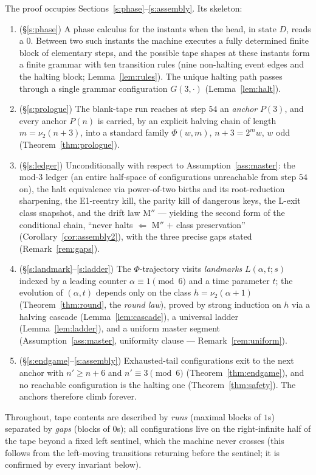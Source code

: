 \documentclass[11pt]{amsart}
\theoremstyle{definition}
\newcommand{\vtwo}[1]{\nu_2(#1)}
\begin{document}
The proof occupies Sections~\ref{s:phase}--\ref{s:assembly}. Its skeleton:
\begin{enumerate}
\item (\S\ref{s:phase}) A phase calculus for the instants when the head, in
state $D$, reads a $0$. Between two such instants the machine executes a
fully determined finite block of elementary steps, and the possible tape
shapes at these instants form a finite grammar with ten transition rules
(nine non-halting event edges and the halting block; Lemma~\ref{lem:rules}).
The unique halting path passes through a single
grammar configuration $G(3,\cdot)$ (Lemma~\ref{lem:halt}).
\item (\S\ref{s:prologue}) The blank-tape run reaches at step $54$ an
\emph{anchor} $P(3)$, and every anchor $P(n)$ is carried, by an explicit
halving chain of length $m=\nu_2(n+3)$, into a standard family
$\Phi(w,m)$, $n+3=2^m w$, $w$ odd (Theorem~\ref{thm:prologue}).
\item (\S\ref{s:ledger}) Unconditionally with respect to
Assumption~\ref{ass:master}: the mod-3 ledger (an entire half-space of
configurations unreachable from step $54$ on), the halt equivalence via
power-of-two births and its root-reduction sharpening, the E1-reentry kill,
the parity kill of dangerous keys, the L-exit class snapshot, and the drift
law $\mathrm{M''}$ --- yielding the second form of the conditional chain,
``never halts $\Leftarrow$ $\mathrm{M''}$ $+$ class preservation''
(Corollary~\ref{cor:assembly2}), with the three precise gaps stated
(Remark~\ref{rem:gaps}).
\item (\S\ref{s:landmark}--\ref{s:ladder}) The $\Phi$-trajectory visits
\emph{landmarks} $L(\alpha,t;s)$ indexed by a leading counter
$\alpha\equiv1\pmod 6$ and a time parameter $t$; the evolution of
$(\alpha,t)$ depends only on the class $h=\vtwo{\alpha+1}$
(Theorem~\ref{thm:round}, the \emph{round law}), proved by strong induction
on $h$ via a halving cascade (Lemma~\ref{lem:cascade}), a universal ladder
(Lemma~\ref{lem:ladder}), and a uniform master segment
(Assumption~\ref{ass:master}, uniformity clause --- Remark~\ref{rem:uniform}).
\item (\S\ref{s:endgame}--\ref{s:assembly}) Exhausted-tail configurations
exit to the next anchor with $n'\ge n+6$ and $n'\equiv3\pmod 6$
(Theorem~\ref{thm:endgame}), and no reachable configuration is the halting
one (Theorem~\ref{thm:safety}). The anchors therefore climb forever.
\end{enumerate}

Throughout, tape contents are described by \emph{runs} (maximal blocks of
$1$s) separated by \emph{gaps} (blocks of $0$s); all configurations live on
the right-infinite half of the tape beyond a fixed left sentinel, which the
machine never crosses (this follows from the left-moving transitions
returning before the sentinel; it is confirmed by every invariant below).
\end{document}
